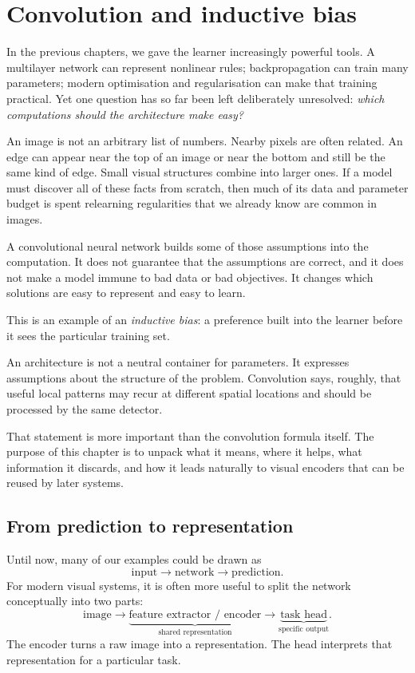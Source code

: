 \chapter{Convolution and inductive bias}
\label{chap:week05}

In the previous chapters, we gave the learner increasingly powerful tools. A multilayer network can represent nonlinear rules; backpropagation can train many parameters; modern optimisation and regularisation can make that training practical. Yet one question has so far been left deliberately unresolved: \emph{which computations should the architecture make easy?}

An image is not an arbitrary list of numbers. Nearby pixels are often related. An edge can appear near the top of an image or near the bottom and still be the same kind of edge. Small visual structures combine into larger ones. If a model must discover all of these facts from scratch, then much of its data and parameter budget is spent relearning regularities that we already know are common in images.

A convolutional neural network builds some of those assumptions into the computation. It does not guarantee that the assumptions are correct, and it does not make a model immune to bad data or bad objectives. It changes which solutions are easy to represent and easy to learn.

This is an example of an \emph{inductive bias}: a preference built into the learner before it sees the particular training set.

\begin{keyidea}
An architecture is not a neutral container for parameters. It expresses assumptions about the structure of the problem. Convolution says, roughly, that useful local patterns may recur at different spatial locations and should be processed by the same detector.
\end{keyidea}

That statement is more important than the convolution formula itself. The purpose of this chapter is to unpack what it means, where it helps, what information it discards, and how it leads naturally to visual encoders that can be reused by later systems.

\section{From prediction to representation}

Until now, many of our examples could be drawn as
\[
  \text{input} \longrightarrow \text{network} \longrightarrow \text{prediction}.
\]
For modern visual systems, it is often more useful to split the network conceptually into two parts:
\[
  \text{image} \longrightarrow \underbrace{\text{feature extractor / encoder}}_{\text{shared representation}}
  \longrightarrow \underbrace{\text{task head}}_{\text{specific output}}.
\]
The encoder turns a raw image into a representation. The head interprets that representation for a particular task.

